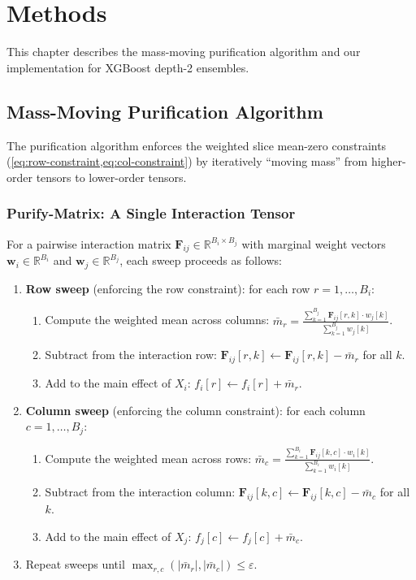 \chapter{Methods}\label{chap:methods}

This chapter describes the mass-moving purification algorithm and our implementation for XGBoost depth-2 ensembles.

\section{Mass-Moving Purification Algorithm}\label{sec:mass-moving}

The purification algorithm enforces the weighted slice mean-zero constraints (\cref{eq:row-constraint,eq:col-constraint}) by iteratively ``moving mass'' from higher-order tensors to lower-order tensors.

\subsection{Purify-Matrix: A Single Interaction Tensor}

For a pairwise interaction matrix $\mathbf{F}_{ij} \in \mathbb{R}^{B_i \times B_j}$ with marginal weight vectors $\mathbf{w}_i \in \mathbb{R}^{B_i}$ and $\mathbf{w}_j \in \mathbb{R}^{B_j}$, each sweep proceeds as follows:
\begin{enumerate}
    \item \textbf{Row sweep} (enforcing the row constraint): for each row $r = 1, \ldots, B_i$:
    \begin{enumerate}
        \item Compute the weighted mean across columns: $\bar{m}_r = \frac{\sum_{k=1}^{B_j} \mathbf{F}_{ij}[r, k] \cdot w_j[k]}{\sum_{k=1}^{B_j} w_j[k]}$.
        \item Subtract from the interaction row: $\mathbf{F}_{ij}[r, k] \leftarrow \mathbf{F}_{ij}[r, k] - \bar{m}_r$ for all $k$.
        \item Add to the main effect of $X_i$: $f_i[r] \leftarrow f_i[r] + \bar{m}_r$.
    \end{enumerate}
    \item \textbf{Column sweep} (enforcing the column constraint): for each column $c = 1, \ldots, B_j$:
    \begin{enumerate}
        \item Compute the weighted mean across rows: $\bar{m}_c = \frac{\sum_{k=1}^{B_i} \mathbf{F}_{ij}[k, c] \cdot w_i[k]}{\sum_{k=1}^{B_i} w_i[k]}$.
        \item Subtract from the interaction column: $\mathbf{F}_{ij}[k, c] \leftarrow \mathbf{F}_{ij}[k, c] - \bar{m}_c$ for all $k$.
        \item Add to the main effect of $X_j$: $f_j[c] \leftarrow f_j[c] + \bar{m}_c$.
    \end{enumerate}
    \item Repeat sweeps until $\max_{r,c}(|\bar{m}_r|, |\bar{m}_c|) \leq \varepsilon$.
\end{enumerate}

